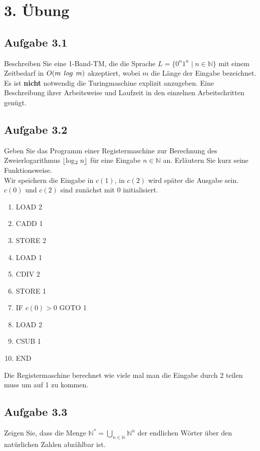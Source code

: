 \section*{3. Übung}
\subsection*{Aufgabe 3.1}
Beschreiben Sie eine 1-Band-TM, die die Sprache $L = \{0^n1^n \mid n \in \mathbb{N}\}$ mit einem Zeitbedarf in $O(m \hspace{0,15cm} log \hspace{0,15cm} m)$ akzeptiert, wobei $m$ die Länge der Eingabe bezeichnet.\\
Es ist \textbf{nicht} notwendig die Turingmaschine explizit anzugeben. Eine Beschreibung ihrer Arbeitsweise und Laufzeit in den einzelnen Arbeitschritten genügt.
\subsection*{Aufgabe 3.2} Geben Sie das Programm einer Registermaschine zur Berechnung des Zweierlogarithmus $\lfloor $log$_2 \hspace{0,1cm} n \rfloor$ für eine Eingabe $n \in \mathbb{N}$ an. Erläutern Sie kurz seine Funktionsweise.\\

Wir speichern die Eingabe in $c(1)$, in $c(2)$ wird später die Ausgabe sein. $c(0)$ und $c(2)$ sind zunächst mit 0 initialisiert.
\begin{enumerate}
	\item LOAD 2
	\item CADD 1
	\item STORE 2
	\item LOAD 1
	\item CDIV 2
	\item STORE 1
	\item IF $c(0) > 0$ GOTO 1
	\item LOAD 2
	\item CSUB 1
	\item END
\end{enumerate}
Die Registermaschine berechnet wie viele mal man die Eingabe durch 2 teilen muss um auf 1 zu kommen.

\subsection*{Aufgabe 3.3}
Zeigen Sie, dass die Menge $\mathbb{N}^* = \bigcup_{n \in \mathbb{N}} \mathbb{N}^n$ der endlichen Wörter über den natürlichen Zahlen abzählbar ist.

